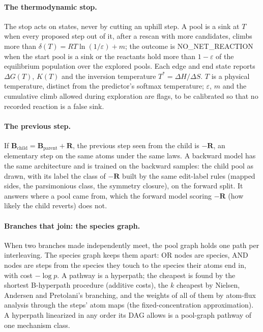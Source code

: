\documentclass[11pt,a4paper]{article}
\newcommand{\vb}[1]{\bm{#1}}
\begin{document}
\paragraph{The thermodynamic stop.} The stop acts on states, never by cutting an uphill step. A pool is a sink at $T$ when every proposed step out of it, after a rescan with more candidates, climbs more than $\delta(T)=RT\ln(1/\varepsilon)+m$; the outcome is NO\_NET\_REACTION when the start pool is a sink or the reactants hold more than $1-\varepsilon$ of the equilibrium population over the explored pools. Each edge and end state reports $\Delta G(T)$, $K(T)$ and the inversion temperature $T^*=\Delta H/\Delta S$. $T$ is a physical temperature, distinct from the predictor's softmax temperature; $\varepsilon$, $m$ and the cumulative climb allowed during exploration are flags, to be calibrated so that no recorded reaction is a false sink.

\paragraph{The previous step.} If $\vb B_{\mathrm{child}}=\vb B_{\mathrm{parent}}+\vb R$, the previous step seen from the child is $-\vb R$, an elementary step on the same atoms under the same laws. A backward model has the same architecture and is trained on the backward samples: the child pool as drawn, with its label the class of $-\vb R$ built by the same edit-label rules (mapped sides, the parsimonious class, the symmetry closure), on the forward split. It answers where a pool came from, which the forward model scoring $-\vb R$ (how likely the child reverts) does not.

\paragraph{Branches that join: the species graph.} When two branches made independently meet, the pool graph holds one path per interleaving. The species graph keeps them apart: OR nodes are species, AND nodes are steps from the species they touch to the species their atoms end in, with cost $-\log p$. A pathway is a hyperpath; the cheapest is found by the shortest B-hyperpath procedure (additive costs), the $k$ cheapest by Nielsen, Andersen and Pretolani's branching, and the weights of all of them by atom-flux analysis through the steps' atom maps (the fixed-concentration approximation). A hyperpath linearized in any order its DAG allows is a pool-graph pathway of one mechanism class.
\end{document}
